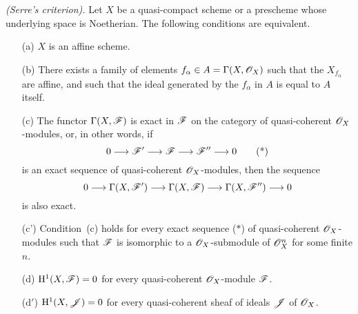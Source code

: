 \begin{theorem}[5.2.1]
\label{II.5.2.1}
\emph{(Serre's criterion).}
Let $X$ be a quasi-compact scheme or a prescheme whose underlying space is Noetherian.
The following conditions are equivalent.
\begin{enumerate}
  \item[{\rm(a)}] $X$ is an affine scheme.
  \item[{\rm(b)}] There exists a family of elements $f_\alpha\in A=\Gamma(X,\mathscr{O}_X)$ such that the $X_{f_\alpha}$ are affine, and such that the ideal generated by the $f_\alpha$ in $A$ is equal to $A$ itself.
  \item[{\rm(c)}] The functor $\Gamma(X,\mathscr{F})$ is exact in $\mathscr{F}$ on the category of quasi-coherent $\mathscr{O}_X$-modules, or, in other words, if
    \[
      0\to\sh{F}'\to\sh{F}\to\sh{F}''\to 0
      \tag{*}
    \]
    is an exact sequence of quasi-coherent $\mathscr{O}_X$-modules, then the sequence
    \[
     0\to\Gamma(X,\sh{F}')\to\Gamma(X,\sh{F})\to\Gamma(X,\sh{F}'')\to 0
    \]
    is also exact.
  \item[{\rm(c')}] Condition~{\rm(c)} holds for every exact sequence {\rm($*$)} of quasi-coherent $\mathscr{O}_X$-modules such that $\mathscr{F}$ is isomorphic to a $\mathscr{O}_X$-submodule of $\mathscr{O}_X^n$ for some finite $n$.
  \item[{\rm(d)}] $\mathrm{H}^1(X,\mathscr{F})=0$ for every quasi-coherent $\mathscr{O}_X$-module $\mathscr{F}$.
  \item[{\rm(d$'$)}] $\mathrm{H}^1(X,\mathscr{J})=0$ for every quasi-coherent sheaf of ideals $\mathscr{J}$ of $\mathscr{O}_X$.
\end{enumerate}
\end{theorem}

